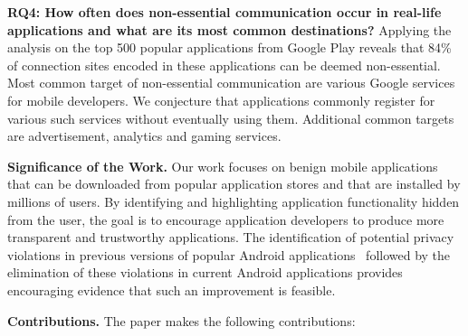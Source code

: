 \vspace{0.05in}
\noindent 
{\bf RQ4: How often does non-essential communication occur in real-life applications and what are its most common destinations?}
Applying the analysis on the top 500 popular applications from Google Play reveals that 84\% of connection sites encoded in these applications can be deemed non-essential.
Most common target of non-essential communication are various Google services for mobile developers. We conjecture 
that applications commonly register for various such services without eventually using them. 
Additional common targets are advertisement, analytics and gaming services. 

\vspace{0.05in}
\noindent 
{\bf Significance of the Work.}  Our work focuses on benign mobile
applications that can be downloaded from popular application stores
and that are installed by millions of users.  By identifying and
highlighting application functionality hidden from the user, the goal
is to encourage application developers to produce more transparent and
trustworthy applications. The identification of potential privacy
violations in previous versions of popular Android
applications~\cite{Enck:Gilbert:Chun:Cox:Jung:McDaniel:Sheth:OSDI10,Egele:Kruegel:Kirda:Vign:NDSS11,Tripp:Rubin:SEC14} followed by the
elimination of these violations in current Android applications
provides encouraging evidence that such an improvement is feasible.

\vspace{0.05in}
\noindent 
{\bf Contributions.}
The paper makes the following contributions:

